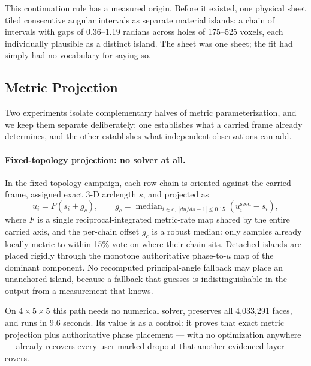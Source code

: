 This continuation rule has a measured origin. Before it existed, one physical sheet tiled consecutive angular intervals as separate material islands: a chain of intervals with gaps of 0.36--1.19 radians across holes of 175--525 voxels, each individually plausible as a distinct island. The sheet was one sheet; the fit had simply had no vocabulary for saying so.

\subsection{Metric Projection}
\label{sec:metric}

Two experiments isolate complementary halves of metric parameterization, and we keep them separate deliberately: one establishes what a carried frame already determines, and the other establishes what independent observations can add.

\paragraph{Fixed-topology projection: no solver at all.} In the fixed-topology campaign, each row chain is oriented against the carried frame, assigned exact 3-D arclength $s$, and projected as
\begin{equation*}
  u_i = F(s_i + g_c),
  \qquad
  g_c = \operatorname{median}_{i\in c,\;|du/ds-1|\le0.15}(u_i^{\mathrm{seed}}-s_i),
\end{equation*}
where $F$ is a single reciprocal-integrated metric-rate map shared by the entire carried axis, and the per-chain offset $g_c$ is a robust median: only samples already locally metric to within 15\% vote on where their chain sits. Detached islands are placed rigidly through the monotone authoritative phase-to-$u$ map of the dominant component. No recomputed principal-angle fallback may place an unanchored island, because a fallback that guesses is indistinguishable in the output from a measurement that knows.

On $4\times5\times5$ this path needs no numerical solver, preserves all 4,033,291 faces, and runs in 9.6 seconds. Its value is as a control: it proves that exact metric projection plus authoritative phase placement --- with no optimization anywhere --- already recovers every user-marked dropout that another evidenced layer covers.

